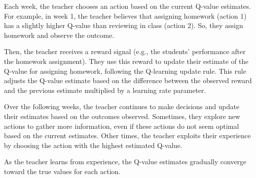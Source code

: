 \documentclass[
  number,
  preprint,
  3p,
  onecolumn]{elsarticle}
\begin{document}
Each week, the teacher chooses an action based on the current Q-value
estimates. For example, in week 1, the teacher believes that assigning
homework (action 1) has a slightly higher Q-value than reviewing in
class (action 2). So, they assign homework and observe the outcome.

Then, the teacher receives a reward signal (e.g., the students'
performance after the homework assignment). They use this reward to
update their estimate of the Q-value for assigning homework, following
the Q-learning update rule. This rule adjusts the Q-value estimate based
on the difference between the observed reward and the previous estimate
multiplied by a learning rate parameter.

Over the following weeks, the teacher continues to make decisions and
update their estimates based on the outcomes observed. Sometimes, they
explore new actions to gather more information, even if these actions do
not seem optimal based on the current estimates. Other times, the
teacher exploits their experience by choosing the action with the
highest estimated Q-value.

As the teacher learns from experience, the Q-value estimates gradually
converge toward the true values for each action.
\end{document}
